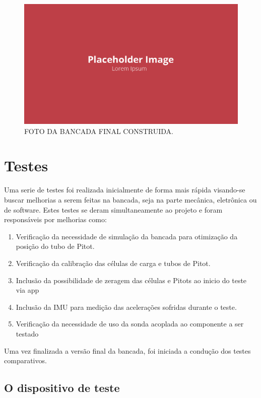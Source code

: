 \begin{figure}[!ht]
    \centering
    \includegraphics[width=.8\linewidth]{figuras/placeholder.png}
    \caption{FOTO DA BANCADA FINAL CONSTRUIDA\cite{autor}.}
    \label{fig:placeholder}
\end{figure}



\section{Testes}

Uma serie de testes foi realizada inicialmente de forma mais rápida visando-se buscar melhorias a serem feitas na bancada, seja na parte mecânica, eletrônica ou de software. Estes testes se deram simultaneamente ao projeto e foram responsáveis por melhorias como:

\begin{enumerate}
    \item Verificação da necessidade de simulação da bancada para otimização da posição do tubo de Pitot.
    \item Verificação da calibração das células de carga e tubos de Pitot.
    \item Inclusão da possibilidade de zeragem das células e Pitots ao inicio do teste via app
    \item Inclusão da IMU para medição das acelerações sofridas durante o teste.
    \item Verificação da necessidade de uso da sonda acoplada ao componente a ser testado
\end{enumerate}

Uma vez finalizada a versão final da bancada, foi iniciada a condução dos testes comparativos.

\subsection{O dispositivo de teste}

